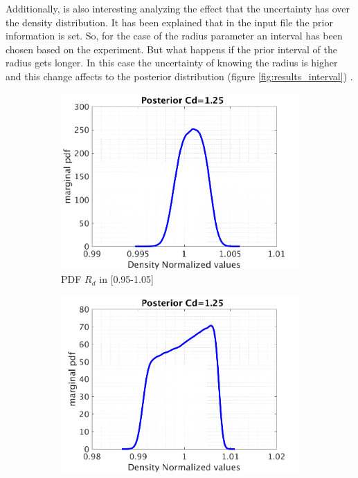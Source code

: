 \documentclass{article}
\begin{document}
Additionally,  is also  interesting analyzing the effect that the uncertainty has over the density distribution. It has been explained that in the input file the prior information is set. So, for the case of the radius parameter an interval has been chosen based on the experiment. But what happens if the prior interval of the radius  gets longer.  In this case the uncertainty of knowing the radius is higher and this change affects to the posterior distribution (figure \ref{fig:results_interval}) .



\begin{figure}[H]
\captionsetup[subfigure]{justification=centering}
\begin{center}
  \begin{subfigure}{0.4\textwidth}
    \centering\includegraphics[width=1.1\textwidth,keepaspectratio]{images/inverse_problem/infer_radius/drag_125/range_short/densityraw_PDF.png}
    \caption{\centering PDF  $R_d$ in [0.95-1.05]}
  \end{subfigure}
 \begin{subfigure}{0.4\textwidth}
    \centering\includegraphics[width=1.1\textwidth,keepaspectratio]{images/inverse_problem/infer_radius/drag_125/range_long/densityraw_PDF.png}

\end{subfigure}
\end{center}
\end{figure}
\end{document}
